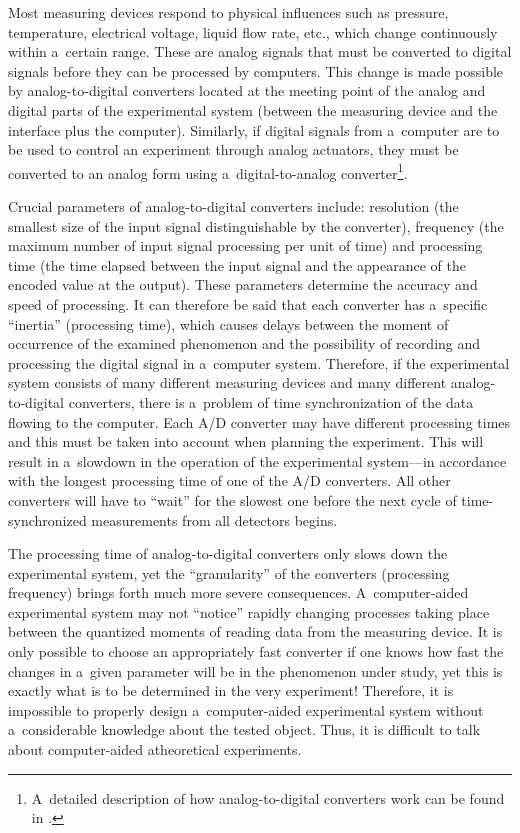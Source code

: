 Most measuring devices respond to physical influences such as pressure, temperature, electrical voltage, liquid flow rate, etc., which change continuously within a~certain range. These are analog signals that must be converted to digital signals before they can be processed by computers. This change is made possible by analog-to-digital converters located at the meeting point of the analog and digital parts of the experimental system (between the measuring device and the interface plus the computer). Similarly, if digital signals from a~computer are to be used to control an experiment through analog actuators, they must be converted to an analog form using a~digital-to-analog converter\footnote{A~detailed description of how analog-to-digital converters work can be found in 
\parencite[][]{pelgrom_analog--digital_2022}.%
}.



Crucial parameters of analog-to-digital converters include: resolution (the smallest size of the input signal distinguishable by the converter), frequency (the maximum number of input signal processing per unit of time) and processing time (the time elapsed between the input signal and the appearance of the encoded value at the output). These parameters determine the accuracy and speed of processing. It can therefore be said that each converter has a~specific ``inertia'' (processing time), which causes delays between the moment of occurrence of the examined phenomenon and the possibility of recording and processing the digital signal in a~computer system. Therefore, if the experimental system consists of many different measuring devices and many different analog-to-digital converters, there is a~problem of time synchronization of the data flowing to the computer. Each A/D converter may have different processing times and this must be taken into account when planning the experiment. This will result in a~slowdown in the operation of the experimental system---in accordance with the longest processing time of one of the A/D converters. All other converters will have to ``wait'' for the slowest one before the next cycle of time-synchronized measurements from all detectors begins.



The processing time of analog-to-digital converters only slows down the experimental system, yet the ``granularity'' of the converters (processing frequency) brings forth much more severe consequences. A~computer-aided experimental system may not ``notice'' rapidly changing processes taking place between the quantized moments of reading data from the measuring device. It is only possible to choose an appropriately fast converter if one knows how fast the changes in a~given parameter will be in the phenomenon under study, yet this is exactly what is to be determined in the very experiment! Therefore, it is impossible to properly design a~computer-aided experimental system without a~considerable knowledge about the tested object. Thus, it is difficult to talk about computer-aided atheoretical experiments.



